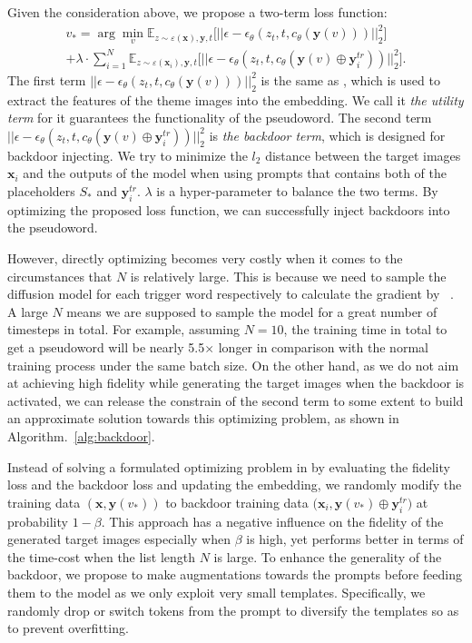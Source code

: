 Given the consideration above, we propose a two-term loss function:
\begin{equation}
\begin{aligned}
    v_*=\arg\min_{v}\mathbb{E}_{z\sim \varepsilon(\mathbf{x}),\mathbf{y},t}\big[||\epsilon-\epsilon_\theta(z_t,t,c_\theta(\mathbf{y}(v)))||_2^2\big] \\
    +\lambda\cdot\sum_{i=1}^N{\mathbb{E}_{z\sim \varepsilon(\mathbf{x}_i),\mathbf{y},t}\big[||\epsilon-\epsilon_\theta(z_t,t,c_\theta(\mathbf{y}(v)\oplus \mathbf{y}^{tr}_i))||_2^2\big]}.
\label{eq: backdoor_loss}
\end{aligned}
\end{equation}
%
The first term $||\epsilon-\epsilon_\theta(z_t,t,c_\theta(\mathbf{y}(v)))||_2^2$ is the same as , which is used to extract the features of the theme images into the embedding. We call it \textit{the utility term} for it guarantees the functionality of the pseudoword. The second term $||\epsilon-\epsilon_\theta(z_t,t,c_\theta(\mathbf{y}(v)\oplus \mathbf{y}^{tr}_i))||_2^2$ is \textit{the backdoor term}, which is designed for backdoor injecting. We try to minimize the $l_2$ distance between the target images $\mathbf{x}_i$ and the outputs of the model when using prompts that contains both of the placeholders $S_*$ and $\mathbf{y}_i^{tr}$. $\lambda$ is a hyper-parameter to balance the two terms. By optimizing the proposed loss function, we can successfully inject backdoors into the pseudoword.

However, directly optimizing  becomes very costly when it comes to the circumstances that $N$ is relatively large. This is because we need to sample the diffusion model for each trigger word respectively to calculate the gradient by ~. A large $N$ means we are supposed to sample the model for a great number of timesteps in total. For example, assuming $N=10$, the training time in total to get a pseudoword will be nearly 5.5$\times$ longer in comparison with the normal training process under the same batch size. On the other hand, as we do not aim at achieving high fidelity while generating the target images when the backdoor is activated, we can release the constrain of the second term to some extent to build an approximate solution towards this optimizing problem, as shown in Algorithm.~\ref{alg:backdoor}.



Instead of solving a formulated optimizing problem in  by evaluating the fidelity loss and the backdoor loss and updating the embedding, we randomly modify the training data $(\mathbf{x},\mathbf{y}(v_*))$ to backdoor training data ${(\mathbf{x}_i, \mathbf{y}(v_*)\oplus\mathbf{y}_i^{tr}})$ at probability $1-\beta$. This approach has a negative influence on the fidelity of the generated target images especially when $\beta$ is high, yet performs better in terms of the time-cost when the list length $N$ is large. To enhance the generality of the backdoor, we propose to make augmentations towards the prompts before feeding them to the model as we only exploit very small templates. Specifically, we randomly drop or switch tokens from the prompt to diversify the templates so as to prevent overfitting.

